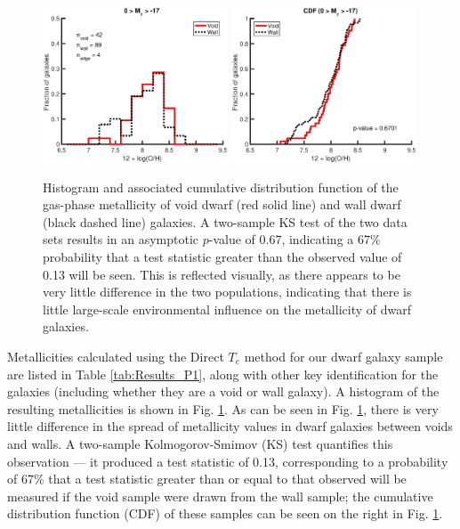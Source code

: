 \begin{figure}
    \centering
    \includegraphics[width=0.49\textwidth]{Images/Paper1/1sig_dwarf_SF_t3_12logOH_hist}
    \includegraphics[width=0.49\textwidth]{Images/Paper1/1sig_dwarf_SF_t3_12logOH_CDF}
    \caption[Metallicity distribution of 135 dwarf galaxy sample]{Histogram and 
    associated cumulative distribution function of the gas-phase metallicity of 
    void dwarf (red solid line) and wall dwarf (black dashed line) galaxies.  A 
    two-sample KS test of the two data sets results in an asymptotic $p$-value 
    of 0.67, indicating a 67\% probability that a test statistic greater than 
    the observed value of 0.13 will be seen.  This is reflected visually, as 
    there appears to be very little difference in the two populations, 
    indicating that there is little large-scale environmental influence on the 
    metallicity of dwarf galaxies.}
    \label{fig:met1sig}
\end{figure}

Metallicities calculated using the Direct $T_e$ method for our dwarf galaxy 
sample are listed in Table \ref{tab:Results_P1}, along with other key 
identification for the galaxies (including whether they are a void or wall 
galaxy).  A histogram of the resulting metallicities is shown in Fig. 
\ref{fig:met1sig}.  As can be seen in Fig. \ref{fig:met1sig}, there is very 
little difference in the spread of metallicity values in dwarf galaxies between 
voids and walls.  A two-sample Kolmogorov-Smimov (KS) test quantifies this 
observation --- it produced a test statistic of 0.13, corresponding to a 
probability of 67\% that a test statistic greater than or equal to that observed 
will be measured if the void sample were drawn from the wall sample; the 
cumulative distribution function (CDF) of these samples can be seen on the right 
in Fig. \ref{fig:met1sig}.

